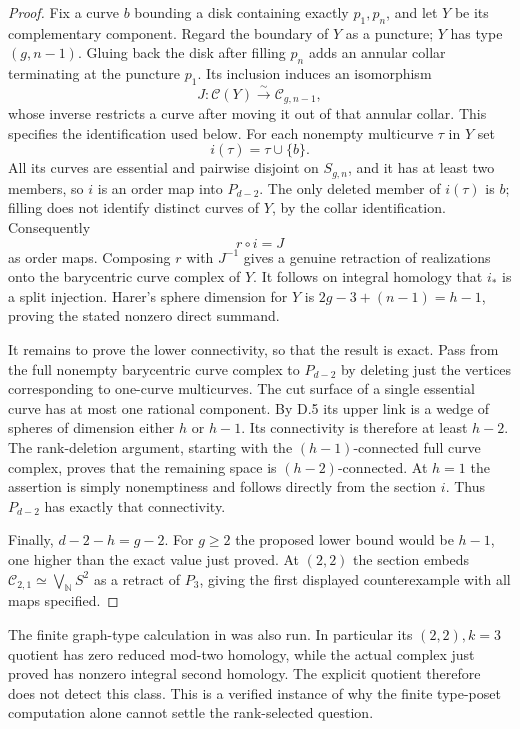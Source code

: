 \begin{proof}
Fix a curve $b$ bounding a disk containing exactly $p_1,p_n$, and let $Y$ be its complementary component. Regard the boundary of $Y$ as a puncture; $Y$ has type $(g,n-1)$. Gluing back the disk after filling $p_n$ adds an annular collar terminating at the puncture $p_1$. Its inclusion induces an isomorphism
\[
 J:\mathcal C(Y)\xrightarrow{\sim}\mathcal C_{g,n-1},
\]
whose inverse restricts a curve after moving it out of that annular collar. This specifies the identification used below. For each nonempty multicurve $\tau$ in $Y$ set
\[
 i(\tau)=\tau\cup\{b\}.
\]
All its curves are essential and pairwise disjoint on $S_{g,n}$, and it has at least two members, so $i$ is an order map into $P_{d-2}$. The only deleted member of $i(\tau)$ is $b$; filling does not identify distinct curves of $Y$, by the collar identification. Consequently
\[
 r\circ i=J
\]
as order maps. Composing $r$ with $J^{-1}$ gives a genuine retraction of realizations onto the barycentric curve complex of $Y$. It follows on integral homology that $i_*$ is a split injection. Harer's sphere dimension for $Y$ is
$2g-3+(n-1)=h-1$, proving the stated nonzero direct summand.

It remains to prove the lower connectivity, so that the result is exact. Pass from the full nonempty barycentric curve complex to $P_{d-2}$ by deleting just the vertices corresponding to one-curve multicurves. The cut surface of a single essential curve has at most one rational component. By D.5 its upper link is a wedge of spheres of dimension either $h$ or $h-1$. Its connectivity is therefore at least $h-2$. The rank-deletion argument, starting with the $(h-1)$-connected full curve complex, proves that the remaining space is $(h-2)$-connected. At $h=1$ the assertion is simply nonemptiness and follows directly from the section $i$. Thus $P_{d-2}$ has exactly that connectivity.

Finally, $d-2-h=g-2$. For $g\geq2$ the proposed lower bound would be $h-1$, one higher than the exact value just proved. At $(2,2)$ the section embeds $\mathcal C_{2,1}\simeq\bigvee_{\mathbb N}S^2$ as a retract of $P_3$, giving the first displayed counterexample with all maps specified.
\end{proof}

The finite graph-type calculation in  was also run. In particular its $(2,2),k=3$ quotient has zero reduced mod-two homology, while the actual complex just proved has nonzero integral second homology. The explicit quotient therefore does not detect this class. This is a verified instance of why the finite type-poset computation alone cannot settle the rank-selected question.

